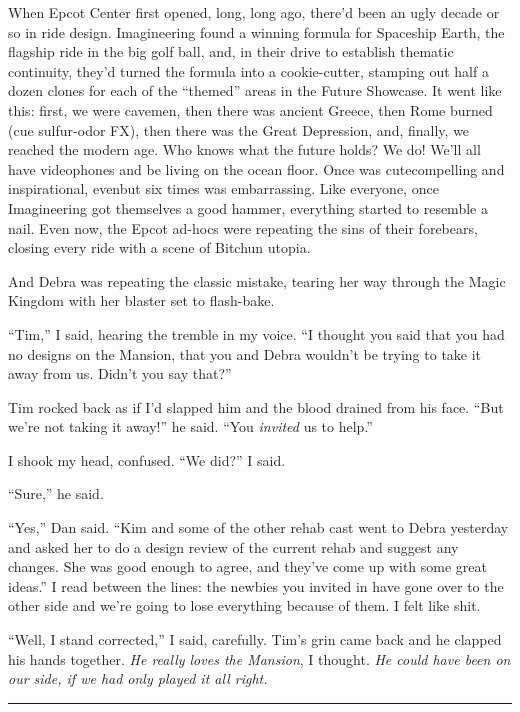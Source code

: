 When Epcot Center first opened, long, long ago, there'd been an
ugly decade or so in ride design. Imagineering found a winning
formula for Spaceship Earth, the flagship ride in the big golf
ball, and, in their drive to establish thematic continuity, they'd
turned the formula into a cookie-cutter, stamping out half a dozen
clones for each of the “themed” areas in the Future Showcase. It
went like this: first, we were cavemen, then there was ancient
Greece, then Rome burned (cue sulfur-odor FX), then there was the
Great Depression, and, finally, we reached the modern age. Who
knows what the future holds? We do! We'll all have videophones and
be living on the ocean floor. Once was cute{\dash}compelling and
inspirational, even{\dash}but six times was embarrassing. Like everyone,
once Imagineering got themselves a good hammer, everything started
to resemble a nail. Even now, the Epcot ad-hocs were repeating the
sins of their forebears, closing every ride with a scene of Bitchun
utopia.

And Debra was repeating the classic mistake, tearing her way
through the Magic Kingdom with her blaster set to flash-bake.

“Tim,” I said, hearing the tremble in my voice. “I thought you said
that you had no designs on the Mansion, that you and Debra wouldn't
be trying to take it away from us. Didn't you say that?”

Tim rocked back as if I'd slapped him and the blood drained from
his face. “But we're not taking it away!” he said. “You
\emph{invited} us to help.”

I shook my head, confused. “We did?” I said.

“Sure,” he said.

“Yes,” Dan said. “Kim and some of the other rehab cast went to
Debra yesterday and asked her to do a design review of the current
rehab and suggest any changes. She was good enough to agree, and
they've come up with some great ideas.” I read between the lines:
the newbies you invited in have gone over to the other side and
we're going to lose everything because of them. I felt like shit.

“Well, I stand corrected,” I said, carefully. Tim's grin came back
and he clapped his hands together.
\emph{He really loves the Mansion}, I thought.
\emph{He could have been on our side, if we had only played it all right.}

\begin{center}\rule{1in}{0.4pt}\end{center}

